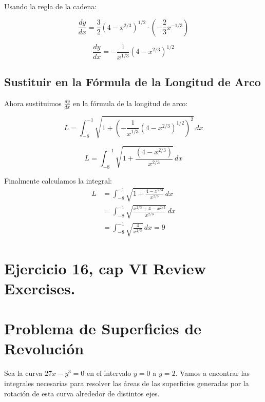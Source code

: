 \documentclass[11pt,letterpaper]{article}
\begin{document}
Usando la regla de la cadena:

\begin{equation*}
  \frac{dy}{dx} = \frac{3}{2} \left( 4 - x^{2/3} \right)^{1/2} \cdot \left( -\frac{2}{3} x^{-1/3} \right)
\end{equation*}

\begin{equation*}
  \frac{dy}{dx} = -\frac{1}{x^{1/3}} \left( 4 - x^{2/3} \right)^{1/2}
\end{equation*}

\subsection*{Sustituir en la Fórmula de la Longitud de Arco}
Ahora sustituimos $\frac{dy}{dx}$ en la f\'ormula de la longitud de arco:

\begin{equation*}
  L = \int_{-8}^{-1} \sqrt{1 + \left( -\frac{1}{x^{1/3}} \left( 4 - x^{2/3} \right)^{1/2} \right)^2} \, dx
\end{equation*}

\begin{equation*}
  L = \int_{-8}^{-1} \sqrt{1 + \frac{(4 - x^{2/3})}{x^{2/3}}} \, dx
\end{equation*}

Finalmente calculamos la integral:
\begin{align*}
    L &= \int_{-8}^{-1} \sqrt{1 + \frac{4-x^{2/3}}{x^{2/3}}} \, dx \\
    &= \int_{-8}^{-1} \sqrt{\frac{x^{2/3} + 4-x^{2/3}}{x^{2/3}}} \, dx \\
    &= \int_{-8}^{-1} \sqrt{\frac{4}{x^{2/3}}} \, dx = 9
    \end{align*}


\section{Ejercicio 16, cap VI Review Exercises.}
\section*{Problema de Superficies de Revolución}

Sea la curva \( 27x - y^3 = 0 \) en el intervalo \( y = 0 \) a \( y = 2 \). Vamos a encontrar las integrales necesarias para resolver las áreas de las superficies generadas por la rotación de esta curva alrededor de distintos ejes.
\end{document}
